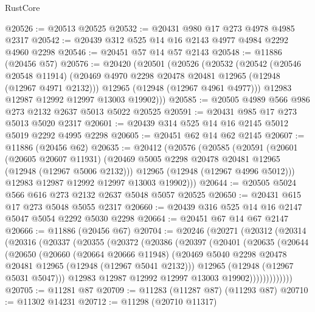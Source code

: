 \begin{lexlean}{RustCore}
\begin{coremodule}
@20526 := @20513 @20525
@20532 := @20431 @980 @17 @273 @4978 @4985 @2317
@20542 := @20439 @312 @525 @14 @16 @2143 @4977 @4984 @2292 @4960 @2298
@20546 := @20451 @57 @14 @57 @2143
@20548 := @11886 (@20456 @57)
@20576 := @20420
    (@20501
      (@20526
        (@20532
          (@20542
            (@20546 @20548 @11914)
            (@20469 @4970 @2298 @20478 @20481 @12965 (@12948 (@12967 @4971 @2132)))
            @12965
            (@12948 (@12967 @4961 @4977)))
          @12983
          @12987
          @12992
          @12997
          @13003
          @19902)))
@20585 := @20505 @4989 @566 @986 @273 @2132 @2637 @5013 @5022 @20525
@20591 := @20431 @985 @17 @273 @5013 @5020 @2317
@20601 := @20439 @314 @525 @14 @16 @2145 @5012 @5019 @2292 @4995 @2298
@20605 := @20451 @62 @14 @62 @2145
@20607 := @11886 (@20456 @62)
@20635 := @20412
    (@20576
      (@20585
        (@20591
          (@20601
            (@20605 @20607 @11931)
            (@20469 @5005 @2298 @20478 @20481 @12965 (@12948 (@12967 @5006 @2132)))
            @12965
            (@12948 (@12967 @4996 @5012)))
          @12983
          @12987
          @12992
          @12997
          @13003
          @19902)))
@20644 := @20505 @5024 @566 @616 @273 @2132 @2637 @5048 @5057 @20525
@20650 := @20431 @615 @17 @273 @5048 @5055 @2317
@20660 := @20439 @316 @525 @14 @16 @2147 @5047 @5054 @2292 @5030 @2298
@20664 := @20451 @67 @14 @67 @2147
@20666 := @11886 (@20456 @67)
@20704 := @20246
    (@20271
      (@20312
        (@20314
          (@20316
            (@20337
              (@20355
                (@20372
                  (@20386
                    (@20397
                      (@20401
                        (@20635
                          (@20644
                            (@20650
                              (@20660
                                (@20664 @20666 @11948)
                                (@20469
                                  @5040
                                  @2298
                                  @20478
                                  @20481
                                  @12965
                                  (@12948 (@12967 @5041 @2132)))
                                @12965
                                (@12948 (@12967 @5031 @5047)))
                              @12983
                              @12987
                              @12992
                              @12997
                              @13003
                              @19902)))))))))))))
@20705 := @11281 @87
@20709 := @11283 (@11287 @87) (@11293 @87)
@20710 := @11302 @14231
@20712 := @11298 (@20710 @11317)

\end{coremodule}
\end{lexlean}
